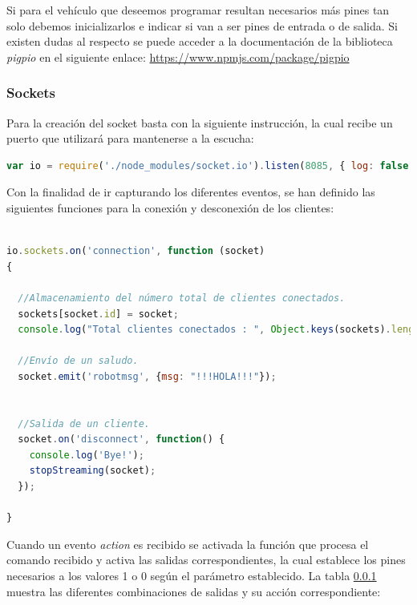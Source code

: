 Si para el vehículo que deseemos programar resultan necesarios más pines tan solo debemos inicializarlos e indicar si van a ser pines de entrada o de salida. Si existen dudas al respecto se puede 
acceder a la documentación de la biblioteca \emph{pigpio} en el siguiente enlace: \url{https://www.npmjs.com/package/pigpio}

\subsubsection{Sockets}


Para la creación del socket basta con la siguiente instrucción, la cual recibe un puerto que utilizará para mantenerse a la escucha: 

\begin{lstlisting}[language=JavaScript]
  var io = require('./node_modules/socket.io').listen(8085, { log: false });
\end{lstlisting}


Con la finalidad de ir capturando los diferentes eventos, se han definido las siguientes funciones para la conexión y desconexión de los clientes:

\begin{lstlisting}[language=JavaScript]

io.sockets.on('connection', function (socket)
{

  //Almacenamiento del número total de clientes conectados.
  sockets[socket.id] = socket;
  console.log("Total clientes conectados : ", Object.keys(sockets).length);
  
  //Envío de un saludo.
  socket.emit('robotmsg', {msg: "!!!HOLA!!!"});


  //Salida de un cliente.
  socket.on('disconnect', function() {
    console.log('Bye!');
    stopStreaming(socket);
  });  
  
}
\end{lstlisting}

Cuando un evento \emph{action} es recibido se activada la función que procesa el comando recibido y activa las salidas correspondientes, la cual establece los pines necesarios a los valores
1 o 0 según el parámetro establecido. La tabla \ref{} muestra las diferentes combinaciones de salidas y su acción correspondiente:

